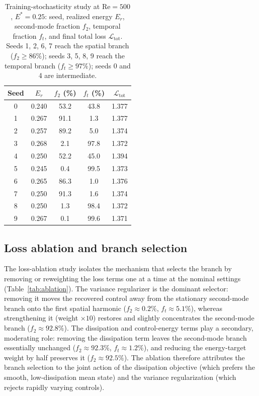 \documentclass[aip,pof,reprint,superscriptaddress]{revtex4-2}
\newcommand{\re}{\mathrm{Re}}
\begin{document}
\begin{table}[t]
\caption{\label{tab:seeds} Training-stochasticity study at $\re=500$, $E^*=0.25$: seed, realized energy $E_r$, second-mode fraction $f_2$, temporal fraction $f_t$, and final total loss $\mathcal{L}_{\mathrm{tot}}$. Seeds 1, 2, 6, 7 reach the spatial branch ($f_2\ge86\%$); seeds 3, 5, 8, 9 reach the temporal branch ($f_t\ge97\%$); seeds 0 and 4 are intermediate.}
\centering
\begin{tabular}{ccccc}
\toprule
Seed & $E_r$ & $f_2$ (\%) & $f_t$ (\%) & $\mathcal{L}_{\mathrm{tot}}$ \\
\midrule
0 & 0.240 & 53.2 & 43.8 & 1.377 \\
1 & 0.267 & 91.1 & 1.3 & 1.377 \\
2 & 0.257 & 89.2 & 5.0 & 1.374 \\
3 & 0.268 & 2.1 & 97.8 & 1.372 \\
4 & 0.250 & 52.2 & 45.0 & 1.394 \\
5 & 0.245 & 0.4 & 99.5 & 1.373 \\
6 & 0.265 & 86.3 & 1.0 & 1.376 \\
7 & 0.250 & 91.3 & 1.6 & 1.374 \\
8 & 0.250 & 1.3 & 98.4 & 1.372 \\
9 & 0.267 & 0.1 & 99.6 & 1.371 \\
\bottomrule
\end{tabular}
\end{table}

\subsection{Loss ablation and branch selection}\label{sec:ablation}

The loss-ablation study isolates the mechanism that selects the branch by removing or reweighting the loss terms one at a time at the nominal settings (Table~\ref{tab:ablation}). The variance regularizer is the dominant selector: removing it moves the recovered control away from the stationary second-mode branch onto the first spatial harmonic ($f_2\approx0.2\%$, $f_t\approx5.1\%$), whereas strengthening it (weight $\times10$) restores and slightly concentrates the second-mode branch ($f_2\approx92.8\%$). The dissipation and control-energy terms play a secondary, moderating role: removing the dissipation term leaves the second-mode branch essentially unchanged ($f_2\approx92.3\%$, $f_t\approx1.2\%$), and reducing the energy-target weight by half preserves it ($f_2\approx92.5\%$). The ablation therefore attributes the branch selection to the joint action of the dissipation objective (which prefers the smooth, low-dissipation mean state) and the variance regularization (which rejects rapidly varying controls).
\end{document}
